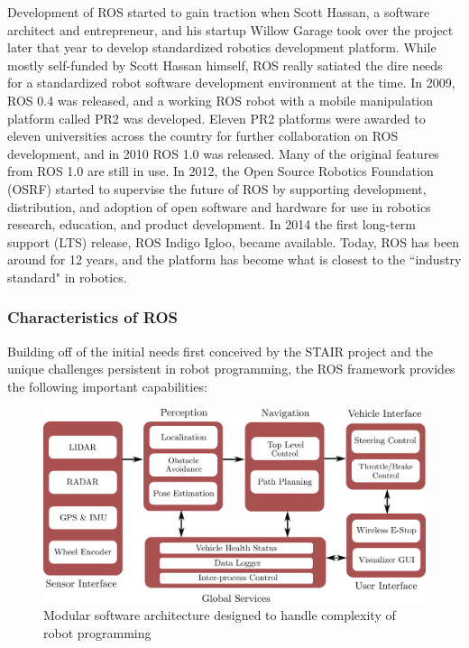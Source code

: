 Development of ROS started to gain traction when Scott Hassan, a software architect and entrepreneur, and his startup  Willow Garage took over the project later that year to develop standardized robotics development platform. While mostly self-funded by Scott Hassan himself, ROS really satiated the dire needs for a standardized robot software development environment at the time. In 2009, ROS 0.4 was released, and a working ROS robot with a mobile manipulation platform called PR2 was developed. Eleven PR2 platforms were awarded to eleven universities across the country for further collaboration on ROS development, and in 2010 ROS 1.0 was released. Many of the original features from ROS 1.0 are still in use. In 2012, the Open Source Robotics Foundation (OSRF) started to supervise the future of ROS by supporting development, distribution, and adoption of open software and hardware for use in robotics research, education, and product development. In 2014 the first long-term support (LTS) release, ROS Indigo Igloo, became available.
Today, ROS has been around for 12 years, and the platform has become what is closest to the ``industry standard" in robotics. 

\subsubsection{Characteristics of ROS}
Building off of the initial needs first conceived by the STAIR project and the unique challenges persistent in robot programming, the ROS framework provides the following important capabilities:
\begin{figure}[t] 
    \centering 
    \includegraphics[width=0.75\linewidth]{tex/figs/ch24_figs/ROS_modular.png}
    \caption{Modular software architecture designed to handle complexity of robot programming}
    \label{modularity} 
\end{figure}

